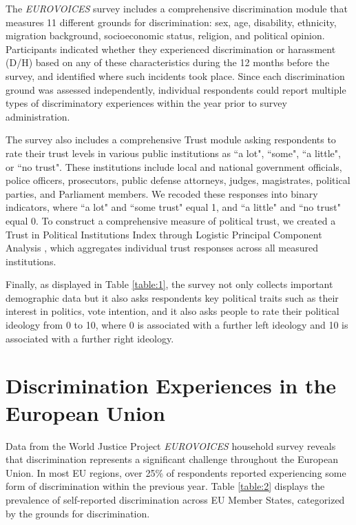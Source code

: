 \documentclass{article}
\begin{document}


The \emph{EUROVOICES} survey includes a comprehensive discrimination module that measures 11 different grounds for discrimination: sex, age, disability, ethnicity, migration background, socioeconomic status, religion, and political opinion. Participants indicated whether they experienced discrimination or harassment (D/H) based on any of these characteristics during the 12 months before the survey, and identified where such incidents took place. Since each discrimination ground was assessed independently, individual respondents could report multiple types of discriminatory experiences within the year prior to survey administration.

The survey also includes a comprehensive Trust module asking respondents to rate their trust levels in various public institutions as ``a lot", ``some", ``a little", or ``no trust". These institutions include local and national government officials, police officers, prosecutors, public defense attorneys, judges, magistrates, political parties, and Parliament members. We recoded these responses into binary indicators, where ``a lot" and ``some trust" equal 1, and ``a little" and ``no trust" equal 0. To construct a comprehensive measure of political trust, we created a Trust in Political Institutions Index through Logistic Principal Component Analysis \parencite{landgraf_dimensionality_2020}, which aggregates individual trust responses across all measured institutions.

Finally, as displayed in Table \ref{table:1}, the survey not only collects important demographic data but it also asks respondents key political traits such as their interest in politics, vote intention, and it also asks people to rate their political ideology from 0 to 10, where 0 is associated with a further left ideology and 10 is associated with a further right ideology.

\section{Discrimination Experiences in the European Union}

Data from the World Justice Project \emph{EUROVOICES} household survey reveals that discrimination represents a significant challenge throughout the European Union. In most EU regions, over 25\% of respondents reported experiencing some form of discrimination within the previous year. Table \ref{table:2} displays the prevalence of self-reported discrimination across EU Member States, categorized by the grounds for discrimination.
\end{document}
